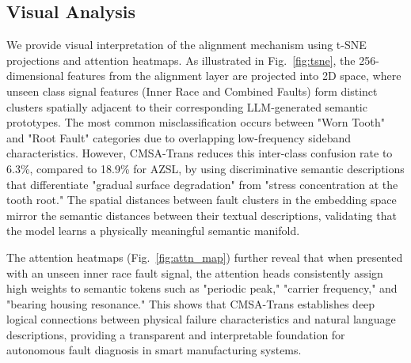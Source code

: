 \subsection{Visual Analysis}
We provide visual interpretation of the alignment mechanism using t-SNE projections and attention heatmaps. As illustrated in Fig.~\ref{fig:tsne}, the 256-dimensional features from the alignment layer are projected into 2D space, where unseen class signal features (Inner Race and Combined Faults) form distinct clusters spatially adjacent to their corresponding LLM-generated semantic prototypes. The most common misclassification occurs between "Worn Tooth" and "Root Fault" categories due to overlapping low-frequency sideband characteristics. However, CMSA-Trans reduces this inter-class confusion rate to 6.3\%, compared to 18.9\% for AZSL, by using discriminative semantic descriptions that differentiate "gradual surface degradation" from "stress concentration at the tooth root." The spatial distances between fault clusters in the embedding space mirror the semantic distances between their textual descriptions, validating that the model learns a physically meaningful semantic manifold.

The attention heatmaps (Fig.~\ref{fig:attn_map}) further reveal that when presented with an unseen inner race fault signal, the attention heads consistently assign high weights to semantic tokens such as "periodic peak," "carrier frequency," and "bearing housing resonance." This shows that CMSA-Trans establishes deep logical connections between physical failure characteristics and natural language descriptions, providing a transparent and interpretable foundation for autonomous fault diagnosis in smart manufacturing systems.

